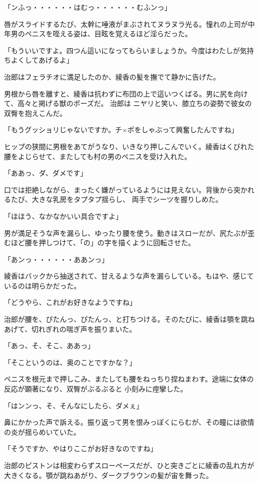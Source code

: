 ﻿\documentclass[book,tate]{jlreq}
\begin{document}
「ンふっ・・・・・・はむっ・・・・・・むふンっ」

唇がスライドするたび、太幹に唾液がまぶされてヌラヌラ光る。憧れの上司が中年男のペニスを咥える姿は、目眩を覚えるほど淫らだった。

「もういいですよ。四つん這いになってもらいましょうか。今度はわたしが気持ちよくしてあげるよ」

治郎はフェラチオに満足したのか、綾香の髪を撫でて静かに告げた。

男根から唇を離すと、綾香は抗わずに布団の上で這いつくばる。男に尻を向けて、高々と掲げる獣のポーズだ。 治郎は ニヤリと笑い、膝立ちの姿勢で彼女の双臀を抱えこんだ。

「もうグッショリじゃないですか。チ×ポをしゃぶって興奮したんですね」

ヒップの狭間に男根をあてがうなり、いきなり押しこんでいく。綾香はくびれた腰をよじらせて、またしても村の男のペニスを受け入れた。

「ああっ、ダ、ダメです」

口では拒絶しながら、まったく嫌がっているようには見えない。背後から突かれるたび、大きな乳房をタプタプ揺らし、 両手でシーツを握りしめた。

「ほほう、なかなかいい具合ですよ」

男が満足そうな声を漏らし、ゆったり腰を使う。動きはスローだが、尻たぶが歪むほど腰を押しつけて、「の」の字を描くように回転させた。

「あンっ・・・・・・ああンっ」

綾香はバックから抽送されて、甘えるような声を漏らしている。もはや、感じているのは明らかだった。

「どうやら、これがお好きなようですね」

治郎が腰を、ぴたんっ、ぴたんっ、と打ちつける。そのたびに、綾香は顎を跳ねあげて、切れぎれの喘ぎ声を振りまいた。

「あっ、そ、そこ、ああっ」

「そこというのは、奥のことですかな？」

ペニスを根元まで押しこみ、またしても腰をねっちり捏ねまわす。途端に女体の反応が顕著になり、双臀がぶるぶると 小刻みに痙攣した。

「はンンっ、そ、そんなにしたら、ダメぇ」

鼻にかかった声で訴える。振り返って男を恨みっぽくにらむが、その瞳には欲情の炎が揺らめいていた。

「そうですか、やはりここがお好きなのですね」

治郎のピストンは相変わらずスローペースだが、ひと突きごとに綾香の乱れ方が大きくなる。顎が跳ねあがり、ダークブラウンの髪が宙を舞った。
\end{document}
